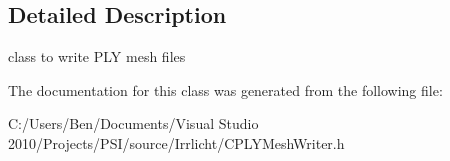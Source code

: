 \subsection{Detailed Description}
class to write P\-L\-Y mesh files 

The documentation for this class was generated from the following file\-:\begin{DoxyCompactItemize}
\item 
C\-:/\-Users/\-Ben/\-Documents/\-Visual Studio 2010/\-Projects/\-P\-S\-I/source/\-Irrlicht/C\-P\-L\-Y\-Mesh\-Writer.\-h\end{DoxyCompactItemize}
